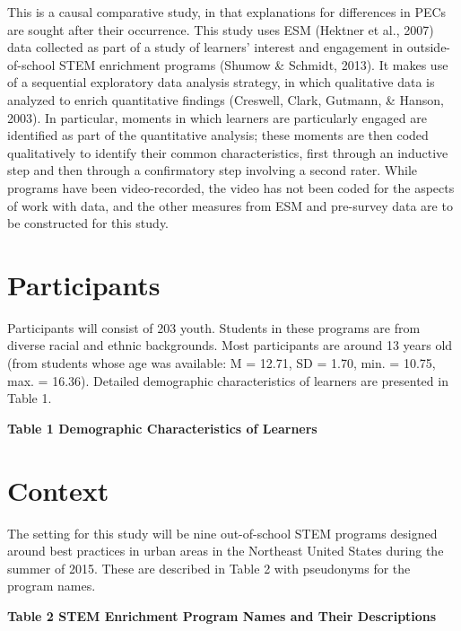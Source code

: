 \documentclass[]{book}
\theoremstyle{definition}
\theoremstyle{definition}
\theoremstyle{definition}
\theoremstyle{remark}
\begin{document}
This is a causal comparative study, in that explanations for differences
in PECs are sought after their occurrence. This study uses ESM (Hektner
et al., 2007) data collected as part of a study of learners' interest
and engagement in outside-of-school STEM enrichment programs (Shumow \&
Schmidt, 2013). It makes use of a sequential exploratory data analysis
strategy, in which qualitative data is analyzed to enrich quantitative
findings (Creswell, Clark, Gutmann, \& Hanson, 2003). In particular,
moments in which learners are particularly engaged are identified as
part of the quantitative analysis; these moments are then coded
qualitatively to identify their common characteristics, first through an
inductive step and then through a confirmatory step involving a second
rater. While programs have been video-recorded, the video has not been
coded for the aspects of work with data, and the other measures from ESM
and pre-survey data are to be constructed for this study.

\section{Participants}\label{participants}

Participants will consist of 203 youth. Students in these programs are
from diverse racial and ethnic backgrounds. Most participants are around
13 years old (from students whose age was available: M = 12.71, SD =
1.70, min. = 10.75, max. = 16.36). Detailed demographic characteristics
of learners are presented in Table 1.

\textbf{Table 1 Demographic Characteristics of Learners}

\section{Context}\label{context}

The setting for this study will be nine out-of-school STEM programs
designed around best practices in urban areas in the Northeast United
States during the summer of 2015. These are described in Table 2 with
pseudonyms for the program names.

\textbf{Table 2 STEM Enrichment Program Names and Their Descriptions}
\end{document}
